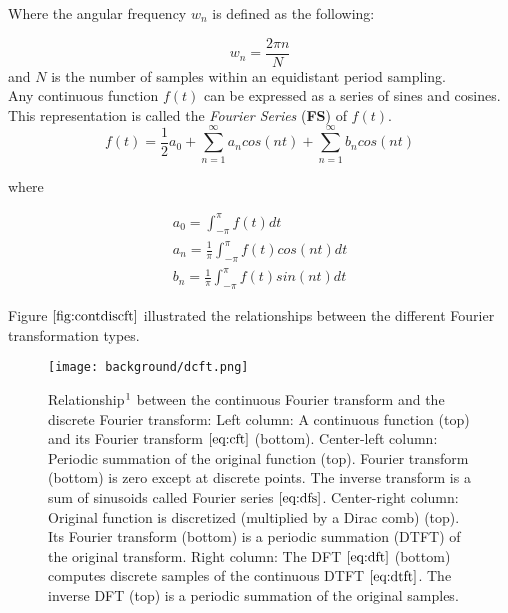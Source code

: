 Where the angular frequency $w_n$ is defined as the following:

\begin{equation}
  w_n = \frac{2\pi n}{N} 
\end{equation}
\noindent
and $N$ is the number of samples within an equidistant period sampling. \\

Any continuous function $f(t)$ can be expressed as a series of sines and cosines. This representation is called the \emph{Fourier Series} (\textbf{FS}) of $f(t)$.
\begin{equation}
  f(t) = \frac{1}{2}a_0 + \sum_{n=1}^{\infty} a_n cos(nt) + \sum_{n=1}^{\infty} b_n cos(nt)
  \label{eq:dfs}
\end{equation}

where

\begin{align}
    a_0 = \int_{-\pi}^{\pi} f(t) dt \nonumber \\
    a_n = \frac{1}{\pi}\int_{-\pi}^{\pi} f(t) cos(nt) dt \nonumber \\
    b_n = \frac{1}{\pi}\int_{-\pi}^{\pi} f(t) sin(nt) dt
\end{align}

Figure $\ref{fig:contdiscft}$ illustrated the relationships between the different Fourier transformation types.

\begin{figure}[H]
  \centering
  \texttt{[image: background/dcft.png]}
  \caption[Relationships between of Different Fourier Transformations]{Relationship$\footnotemark$ between the continuous Fourier transform and the discrete Fourier transform: Left column: A continuous function (top) and its Fourier transform $\ref{eq:cft}$ (bottom). Center-left column: Periodic summation of the original function (top). Fourier transform (bottom) is zero except at discrete points. The inverse transform is a sum of sinusoids called Fourier series $\ref{eq:dfs}$. Center-right column: Original function is discretized (multiplied by a Dirac comb) (top). Its Fourier transform (bottom) is a periodic summation (DTFT) of the original transform. Right column: The DFT $\ref{eq:dft}$ (bottom) computes discrete samples of the continuous DTFT $\ref{eq:dtft}$. The inverse DFT (top) is a periodic summation of the original samples.}
\label{fig:contdiscft}
\end{figure}

